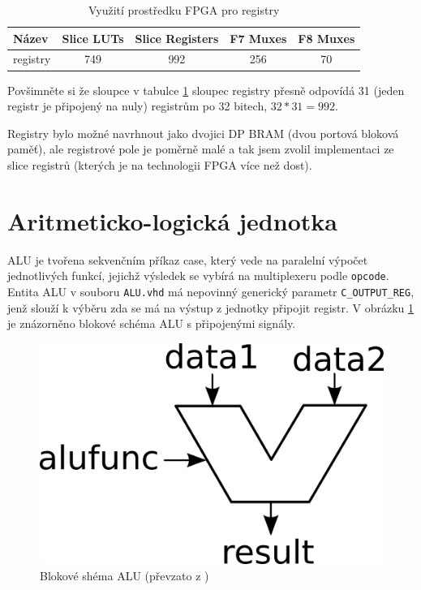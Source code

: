 \documentclass[FM,BP]{tulthesis}
\begin{document}
\begin{table}[h]
    \caption{Využití prostředku FPGA pro registry}
    \label{table:registers_resources}
    \begin{center}
        \begin{tabular}{|l|c|c|c|c|}
        \hline
        \textbf{Název} & 
        \textbf{Slice LUTs} & 
        \textbf{Slice Registers} & 
        \textbf{F7 Muxes} & 
        \textbf{F8 Muxes} \\
        \hline
        registry & 749 & 992 & 256 & 70 \\
        \hline
        \end{tabular}
    \end{center}
\end{table}

Povšimněte si že sloupce v tabulce \ref{table:registers_resources} sloupec registry přesně odpovídá 31 (jeden registr je připojený na nuly) registrům po 32 bitech, $32*31 = 992$.

Registry bylo možné navrhnout jako dvojici DP BRAM (dvou portová bloková paměť), ale registrové pole je poměrně malé a tak jsem zvolil implementaci ze slice registrů (kterých je na technologii FPGA více než dost).

\newpage
\section{Aritmeticko-logická jednotka}
ALU je tvořena sekvenčním příkaz case, který vede na paralelní výpočet jednotlivých funkcí, jejichž výsledek se vybírá na multiplexeru podle \verb|opcode|.  
Entita ALU v souboru \verb|ALU.vhd| má nepovinný generický parametr \verb|C_OUTPUT_REG|, jenž slouží k výběru zda se má na výstup z jednotky připojit registr. V obrázku \ref{fig:ALU} je znázorněno blokové schéma ALU s připojenými signály. 

\begin{figure}[h]
    \centering
    \includegraphics[scale=1]{assets/ALU_block.png}
    \caption{Blokové shéma ALU (převzato z \cite{wiki_ALU})}
    \label{fig:ALU}
\end{figure}
\end{document}
